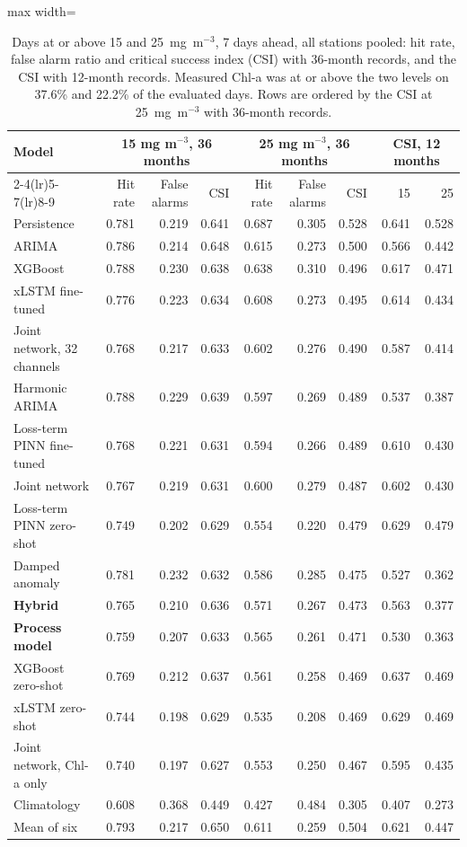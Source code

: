 \begin{table}[tbp]
\centering
\caption{Days at or above 15 and 25~mg~m$^{-3}$, 7 days ahead, all stations pooled: hit rate, false alarm ratio and critical success index (CSI) with 36-month records, and the CSI with 12-month records. Measured Chl-a was at or above the two levels on 37.6\% and 22.2\% of the evaluated days. Rows are ordered by the CSI at 25~mg~m$^{-3}$ with 36-month records.}
\label{tab:S_alerts}
\footnotesize
\setlength{\tabcolsep}{3.5pt}
\begin{adjustbox}{max width=\textwidth}
\begin{tabular}{lrrrrrrrr}
\toprule
Model & \multicolumn{3}{c}{15 mg m$^{-3}$, 36 months} & \multicolumn{3}{c}{25 mg m$^{-3}$, 36 months} & \multicolumn{2}{c}{CSI, 12 months} \\ \cmidrule(lr){2-4}\cmidrule(lr){5-7}\cmidrule(lr){8-9}
 & Hit rate & False alarms & CSI & Hit rate & False alarms & CSI & 15 & 25 \\
\midrule
Persistence & 0.781 & 0.219 & 0.641 & 0.687 & 0.305 & 0.528 & 0.641 & 0.528 \\
ARIMA & 0.786 & 0.214 & 0.648 & 0.615 & 0.273 & 0.500 & 0.566 & 0.442 \\
XGBoost & 0.788 & 0.230 & 0.638 & 0.638 & 0.310 & 0.496 & 0.617 & 0.471 \\
xLSTM fine-tuned & 0.776 & 0.223 & 0.634 & 0.608 & 0.273 & 0.495 & 0.614 & 0.434 \\
Joint network, 32 channels & 0.768 & 0.217 & 0.633 & 0.602 & 0.276 & 0.490 & 0.587 & 0.414 \\
Harmonic ARIMA & 0.788 & 0.229 & 0.639 & 0.597 & 0.269 & 0.489 & 0.537 & 0.387 \\
Loss-term PINN fine-tuned & 0.768 & 0.221 & 0.631 & 0.594 & 0.266 & 0.489 & 0.610 & 0.430 \\
Joint network & 0.767 & 0.219 & 0.631 & 0.600 & 0.279 & 0.487 & 0.602 & 0.430 \\
Loss-term PINN zero-shot & 0.749 & 0.202 & 0.629 & 0.554 & 0.220 & 0.479 & 0.629 & 0.479 \\
Damped anomaly & 0.781 & 0.232 & 0.632 & 0.586 & 0.285 & 0.475 & 0.527 & 0.362 \\
\textbf{Hybrid} & 0.765 & 0.210 & 0.636 & 0.571 & 0.267 & 0.473 & 0.563 & 0.377 \\
\textbf{Process model} & 0.759 & 0.207 & 0.633 & 0.565 & 0.261 & 0.471 & 0.530 & 0.363 \\
XGBoost zero-shot & 0.769 & 0.212 & 0.637 & 0.561 & 0.258 & 0.469 & 0.637 & 0.469 \\
xLSTM zero-shot & 0.744 & 0.198 & 0.629 & 0.535 & 0.208 & 0.469 & 0.629 & 0.469 \\
Joint network, Chl-a only & 0.740 & 0.197 & 0.627 & 0.553 & 0.250 & 0.467 & 0.595 & 0.435 \\
Climatology & 0.608 & 0.368 & 0.449 & 0.427 & 0.484 & 0.305 & 0.407 & 0.273 \\
\midrule
Mean of six & 0.793 & 0.217 & 0.650 & 0.611 & 0.259 & 0.504 & 0.621 & 0.447 \\
\bottomrule
\end{tabular}
\end{adjustbox}
\end{table}
